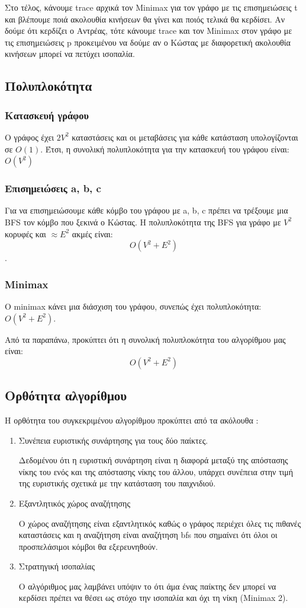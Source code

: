 \documentclass[a4paper,oneside, 11pt]{article}
\begin{document}
Στο τέλος, κάνουμε trace αρχικά τον Minimax για τον γράφο με τις επισημειώσεις t και βλέπουμε ποιά ακολουθία κινήσεων θα γίνει και ποιός τελικά θα κερδίσει. Αν δούμε ότι κερδίζει ο Αντρέας, τότε κάνουμε trace και τον Minimax στον γράφο με τις επισημειώσεις p προκειμένου να δούμε αν ο Κώστας με διαφορετική ακολουθία κινήσεων μπορεί να πετύχει ισοπαλία. \bigbreak 
\subsection{Πολυπλοκότητα}
\subsubsection{Κατασκευή γράφου}
Ο γράφος έχει $2V^2$ καταστάσεις και οι μεταβάσεις για κάθε κατάσταση υπολογίζονται σε $O(1)$. Έτσι, η συνολική πολυπλοκότητα για την κατασκευή του γράφου είναι: $O(V^2)$

\subsubsection{Επισημειώσεις a, b, c}
Για να επισημειώσουμε κάθε κόμβο του γράφου με a, b, c πρέπει να τρέξουμε μια BFS τον κόμβο που ξεκινά ο Κώστας. Η πολυπλοκότητα της BFS για γράφο με $V^2$ κορυφές και $\approx E^2$ ακμές είναι:
$$O(V^2 + E^2)$$. \bigbreak


\subsubsection{Minimax}
Ο minimax κάνει μια διάσχιση του γράφου, συνεπώς έχει πολυπλοκότητα: $O(V^2 + E^2)$. \bigbreak


Από τα παραπάνω, προκύπτει ότι η συνολική πολυπλοκότητα του αλγορίθμου μας είναι:
$$O(V^2 + E^2)$$

\subsection{Ορθότητα αλγορίθμου} 
Η ορθότητα του συγκεκριμένου αλγορίθμου προκύπτει από τα ακόλουθα :
\begin{enumerate}
\item Συνέπεια ευριστικής συνάρτησης για τους δύο παίκτες. \bigbreak 

Δεδομένου ότι η ευριστική συνάρτηση είναι η διαφορά μεταξύ της απόστασης νίκης του ενός και της απόστασης νίκης του άλλου, υπάρχει συνέπεια στην τιμή της ευριστικής σχετικά με την κατάσταση του παιχνιδιού.

\item Εξαντλητικός χώρος αναζήτησης \bigbreak 

Ο χώρος αναζήτησης είναι εξαντλητικός καθώς ο γράφος περιέχει όλες τις πιθανές καταστάσεις και η αναζήτηση είναι αναζήτηση bfs που σημαίνει ότι όλοι οι προσπελάσιμοι κόμβοι θα εξερευνηθούν.

\item Στρατηγική ισοπαλίας \bigbreak

Ο αλγόριθμος μας λαμβάνει υπόψιν το ότι άμα ένας παίκτης δεν μπορεί να κερδίσει πρέπει να θέσει ως στόχο την ισοπαλία και όχι τη νίκη (Minimax 2).
\end{enumerate}
\end{document}
